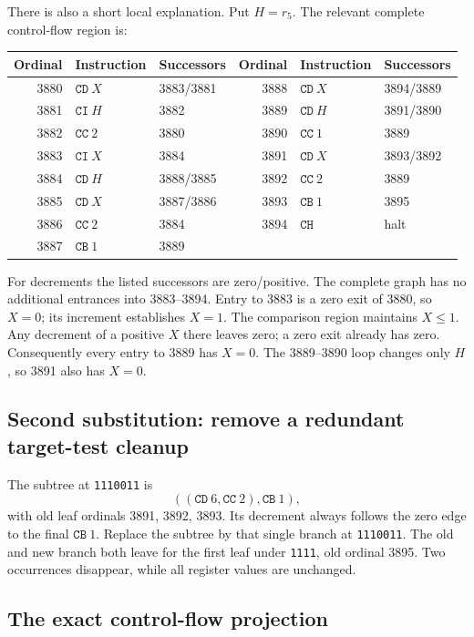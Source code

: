 \documentclass[11pt,a4paper]{article}
\theoremstyle{definition}
\newcommand{\CI}{\mathtt{CI}}
\newcommand{\CD}{\mathtt{CD}}
\newcommand{\CB}{\mathtt{CB}}
\newcommand{\CC}{\mathtt{CC}}
\newcommand{\CH}{\mathtt{CH}}
\begin{document}
There is also a short local explanation. Put $H=r_5$. The relevant complete control-flow region is:
\begin{center}\small
\begin{tabular}{@{}rllrll@{}}
\toprule
Ordinal & Instruction & Successors & Ordinal & Instruction & Successors\\
\midrule
3880 & $\CD\ X$ & 3883/3881 & 3888 & $\CD\ X$ & 3894/3889\\
3881 & $\CI\ H$ & 3882 & 3889 & $\CD\ H$ & 3891/3890\\
3882 & $\CC\ 2$ & 3880 & 3890 & $\CC\ 1$ & 3889\\
3883 & $\CI\ X$ & 3884 & 3891 & $\CD\ X$ & 3893/3892\\
3884 & $\CD\ H$ & 3888/3885 & 3892 & $\CC\ 2$ & 3889\\
3885 & $\CD\ X$ & 3887/3886 & 3893 & $\CB\ 1$ & 3895\\
3886 & $\CC\ 2$ & 3884 & 3894 & $\CH$ & halt\\
3887 & $\CB\ 1$ & 3889 & & &\\
\bottomrule
\end{tabular}
\end{center}
For decrements the listed successors are zero/positive. The complete graph has no additional entrances into 3883--3894. Entry to 3883 is a zero exit of 3880, so $X=0$; its increment establishes $X=1$. The comparison region maintains $X\le1$. Any decrement of a positive $X$ there leaves zero; a zero exit already has zero. Consequently every entry to 3889 has $X=0$. The 3889--3890 loop changes only $H$, so 3891 also has $X=0$.

\subsection{Second substitution: remove a redundant target-test cleanup}

The subtree at \texttt{1110011} is
\[
((\CD\ 6,\CC\ 2),\CB\ 1),
\]
with old leaf ordinals 3891, 3892, 3893. Its decrement always follows the zero edge to the final $\CB\ 1$. Replace the subtree by that single branch at \texttt{1110011}. The old and new branch both leave for the first leaf under \texttt{1111}, old ordinal 3895. Two occurrences disappear, while all register values are unchanged.

\subsection{The exact control-flow projection}
\end{document}
